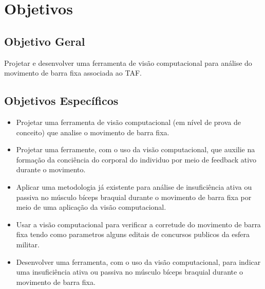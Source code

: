 \section{Objetivos}

\subsection{Objetivo Geral}	

Projetar e desenvolver uma ferramenta de visão computacional para análise do movimento de barra fixa associada ao TAF.

\subsection{Objetivos Específicos}	

\begin{itemize}

    \item Projetar uma ferramenta de visão computacional (em nível de prova de conceito) que analise o movimento de barra fixa.

    \item Projetar uma ferramente, com o uso da visão computacional, que auxilie na formação da conciência do corporal do individuo por meio de feedback ativo durante o movimento.

    \item Aplicar uma metodologia já existente para análise de insuficiência ativa ou passiva no músculo bíceps braquial durante o movimento de barra fixa por meio de uma aplicação da visão computacional.

    \item Usar a visão computacional para verificar a corretude do movimento de barra fixa tendo como parametros alguns editais de concursos publicos da esfera militar.
    
    \item Desenvolver uma ferramenta, com o uso da visão computacional, para indicar uma insuficiência ativa ou passiva no músculo bíceps braquial durante o movimento de barra fixa.


\end{itemize}